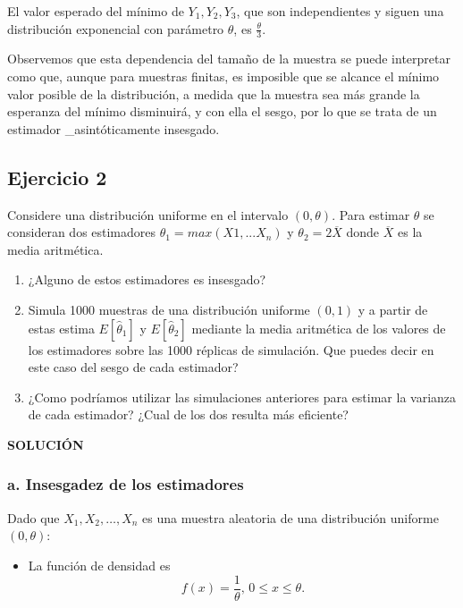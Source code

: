 \documentclass[
]{article}
\providecommand{\tightlist}{%
  \setlength{\itemsep}{0pt}\setlength{\parskip}{0pt}}
\begin{document}
El valor esperado del mínimo de \(Y_1, Y_2, Y_3\), que son independientes y siguen una distribución exponencial con parámetro \(\theta\), es \(\frac{\theta}{3}\).

Observemos que esta dependencia del tamaño de la muestra se puede interpretar como que, aunque para muestras finitas, es imposible que se alcance el mínimo valor posible de la distribución, a medida que la muestra sea más grande la esperanza del mínimo disminuirá, y con ella el sesgo, por lo que se trata de un estimador \_asintóticamente insesgado.

\subsection{Ejercicio 2}\label{ejercicio-2-2}

Considere una distribución uniforme en el intervalo \((0, \theta)\). Para estimar \(\theta\) se consideran dos estimadores \(\theta_1 = max(X1,...X_n)\) y \(\theta_2 = 2 \overline{X}\) donde \(\overline{X}\) es la media aritmética.

\begin{enumerate}
\def\labelenumi{\alph{enumi}.}
\tightlist
\item
  ¿Alguno de estos estimadores es insesgado?
\item
  Simula 1000 muestras de una distribución uniforme \((0,1)\) y a partir de estas estima \(E[\hat \theta_1]\) y \(E[\hat \theta_2 ]\) mediante la media aritmética de los valores de los estimadores sobre las 1000 réplicas de simulación. Que puedes decir en este caso del sesgo de cada estimador?
\item
  ¿Como podríamos utilizar las simulaciones anteriores para estimar la varianza de cada estimador? ¿Cual de los dos resulta más eficiente?
\end{enumerate}

\textbf{SOLUCIÓN}

\subsubsection{a. Insesgadez de los estimadores}\label{a.-insesgadez-de-los-estimadores-1}

Dado que \(X_1, X_2, \dots, X_n\) es una muestra aleatoria de una distribución uniforme \((0, \theta)\):

\begin{itemize}
\tightlist
\item
  La función de densidad es \[f(x) = \frac{1}{\theta}, \, 0 \leq x \leq \theta.\]
\end{itemize}
\end{document}
